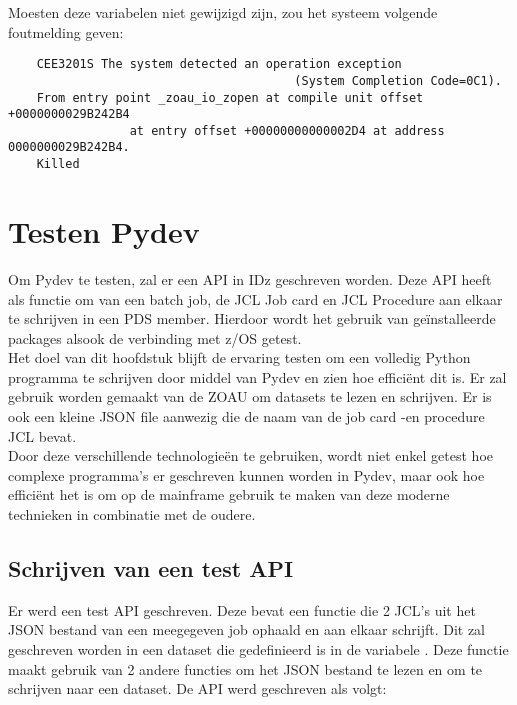 Moesten deze variabelen niet gewijzigd zijn, zou het systeem volgende foutmelding geven:
\begin{lstlisting}
    CEE3201S The system detected an operation exception 
                                        (System Completion Code=0C1).
    From entry point _zoau_io_zopen at compile unit offset +0000000029B242B4 
                 at entry offset +00000000000002D4 at address 0000000029B242B4.
    Killed
\end{lstlisting}

\chapter{Testen Pydev}
\label{ch:test-pydev}

Om Pydev te testen, zal er een API in IDz geschreven worden. Deze API heeft als functie om van een batch job, de JCL Job card en JCL Procedure aan elkaar te schrijven in een PDS member. Hierdoor wordt het gebruik van geïnstalleerde packages alsook de verbinding met z/OS getest. \\

Het doel van dit hoofdstuk blijft de ervaring testen om een volledig Python programma te schrijven door middel van Pydev en zien hoe efficiënt dit is. Er zal gebruik worden gemaakt van de ZOAU om datasets te lezen en schrijven. Er is ook een kleine JSON file aanwezig die de naam van de job card -en procedure JCL bevat. \\

Door deze verschillende technologieën te gebruiken, wordt niet enkel getest hoe complexe programma's er geschreven kunnen worden in Pydev, maar ook hoe efficiënt het is om op de mainframe gebruik te maken van deze moderne technieken in combinatie met de oudere.

\section{Schrijven van een test API}
Er werd een test API geschreven. Deze bevat een functie die 2 JCL's uit het JSON bestand van een meegegeven job ophaald en aan elkaar schrijft. Dit zal geschreven worden in een dataset die gedefinieerd is in de variabele . Deze functie maakt gebruik van 2 andere functies om het JSON bestand te lezen en om te schrijven naar een dataset. De API werd geschreven als volgt: \\

